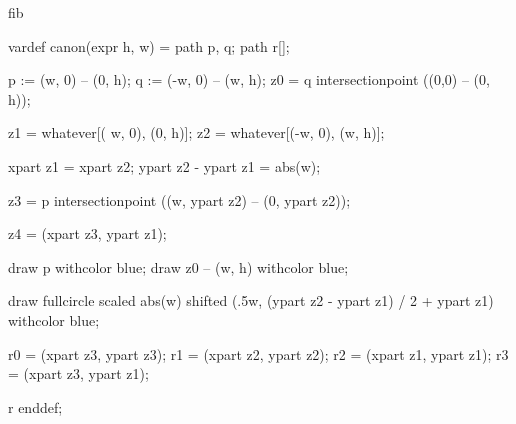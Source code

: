 

\startenvironment fib

	\setuppagenumbering[alternative=doublesided]

	\startMPdefinitions
		vardef canon(expr h, w) =
			path p, q;
			path r[];

			p := (w,  0) -- (0, h); %
			q := (-w, 0) -- (w, h); %
			z0 = q intersectionpoint ((0,0) -- (0, h)); %

			z1 = whatever[( w, 0), (0, h)]; %
			z2 = whatever[(-w, 0), (w, h)]; %

			xpart z1 = xpart z2;
			ypart z2 - ypart z1 = abs(w);

			z3 = p intersectionpoint ((w, ypart z2) -- (0, ypart z2)); %

			z4 = (xpart z3, ypart z1); %

			draw p withcolor blue;
			draw z0 -- (w, h) withcolor blue;

			draw fullcircle scaled abs(w) shifted (.5w, (ypart z2 - ypart z1) / 2 + ypart z1) withcolor blue;



			r0 = (xpart z3, ypart z3); %
			r1 = (xpart z2, ypart z2); %
			r2 = (xpart z1, ypart z1); %
			r3 = (xpart z3, ypart z1); %

			r
		enddef;
	\stopMPdefinitions

\stopenvironment

